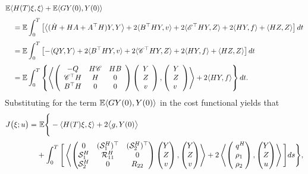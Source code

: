 \documentclass[11pt,times,twoside]{article}
\def\dbE{\mathbb{E}} \def\sE{\mathscr{E}} \def\fE{\mathfrak{E}} \def\cE{{\cal E}} \def\BE{{\bf E}} \def\Be{{\bf e}}
\begin{document}
\begin{align*}
\ds &\dbE \lan H(T)\xi, \xi\ran  + \dbE\lan G Y(0), Y(0)\ran \\
%
\ns\ds &\q= \dbE  \int_{0}^{T}\left[\big\lan (\dot{H}+H A+A^{\top} H) Y, Y\big\ran
+2\lan B^{\top} H Y, v\ran+2\lan\mathscr{E}^{\top} H Y, Z\ran +2\lan HY,f\ran
+\lan H Z, Z\ran\right] d t \\
%
\ns\ds &\q=\dbE  \int_{0}^{T}\left[-\lan QY, Y\ran+2 \lan B^{\top} H Y, v \ran+2 \lan\mathscr{C}^{\top} H Y, Z \ran
+2\lan HY,f\ran+\lan H Z, Z\ran\right] d t \\
%
%
\ns\ds &\q=\dbE \int_{0}^{T}\left\{\left\lan\left(\begin{array}{ccc}-Q & H \mathscr{C} & H B \\ \mathscr{C}^{\top} H & H & 0 \\
B^{\top} H & 0 & 0
\end{array}\right)\left(\begin{array}{c}
Y \\
Z \\
v
\end{array}\right),\left(\begin{array}{l}
Y \\
Z \\
v
\end{array}\right)\right\ran +2\lan HY,f\ran \right\} dt .
\end{align*}
%
Substituting for the term $\dbE \lan G Y(0), Y(0)\ran$ in the cost functional  yields that
%
\begin{align}
\ds J\big(\xi;u\big)=&~\dbE\Bigg\{-\lan H(T) \xi, \xi\ran+2\big\lan g,Y(0)\big\ran \nonumber\\
%
\ns\ds & +\int_0^T\Bigg[
\llan\begin{pmatrix}0&(\cS^H_1)^\top&(\cS^H_2)^\top\\ \cS^H_1&\cR^H_{11}&0
\\ \cS^H_2&0&R_{22} \end{pmatrix}
\begin{pmatrix}Y\\Z\\v\end{pmatrix},
\begin{pmatrix}Y\\Z\\v\end{pmatrix}\rran
%
+2\llan\begin{pmatrix}\ q^H\\ \rho_1\\ \rho_2 \end{pmatrix},
   \begin{pmatrix}Y\\Z\\u\end{pmatrix}\rran\Bigg] ds\Bigg\}, \nonumber
%
\end{align}
\end{document}
